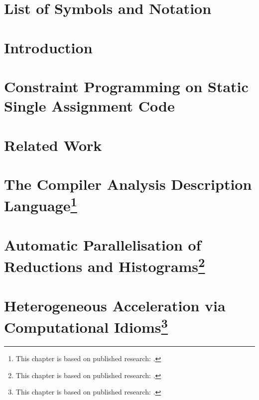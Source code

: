 \documentclass[phd,icsa,twoside,logo,11pt]{infthesis}
\begin{document}
\chapter*{List of Symbols and Notation}
    

\chapter{Introduction}
    \label{chapter:introduction}
    

\chapter{Constraint Programming on Static Single Assignment Code}
    \label{chapter:theory}
    

\chapter{Related Work}
    \label{chapter:literature}
    

\chapter[The Compiler Analysis Description Language]
        {The Compiler Analysis Description Language\footnote{This
         chapter is based on published research:
         \citet{Ginsbach:2018:CDS:3178372.3179515}.}}
    \label{chapter:candl}
    

\chapter[Automatic Parallelisation of Reductions and Histograms]
        {Automatic Parallelisation of Reductions and Histograms\footnote{This
         chapter is based on published research:
         \citet{ginsbach2017discovery}.}}
    \label{chapter:reductions}
    

\chapter[Heterogeneous Acceleration via Computational Idioms]
        {Heterogeneous Acceleration via Computational Idioms\footnote{This
         chapter is based on published research:
         \citet{Ginsbach:2018:AML:3173162.3173182}.}}
    \label{chapter:idioms}
    
\end{document}
